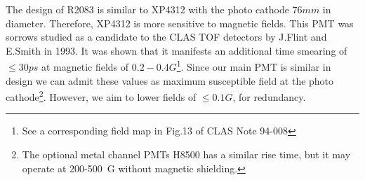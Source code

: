\documentclass[12pt]{article}
\begin{document}
The design of R2083  is similar   to XP4312
with the photo cathode  $76mm$ in diameter. Therefore, XP4312  is more sensitive to magnetic 
fields. This PMT  was sorrows studied as a candidate to the CLAS TOF detectors by J.Flint
and E.Smith in 1993. It was shown that it    
manifests  an  additional time smearing of $\leq30ps$  at magnetic fields 
of  $0.2-0.4G$\footnote{See a corresponding field map in Fig.13 of  CLAS Note 94-008}.
Since our main PMT is similar in design we can admit these values as
 maximum susceptible field at the photo cathode\footnote{The   optional metal channel PMTs H8500 has a similar  
rise time, but it  may operate at 200-500~G  without magnetic shielding.}.
 However, we aim to lower fields of $\leq0.1G$, for redundancy.
%
\end{document}
